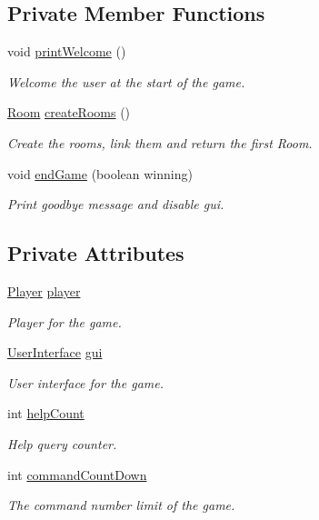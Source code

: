 \subsection*{Private Member Functions}
\begin{DoxyCompactItemize}
\item 
void \hyperlink{classGameEngine_a9a2f3cb921bb19399e357bf14d26425b}{print\-Welcome} ()
\begin{DoxyCompactList}\small\item\em Welcome the user at the start of the game. \end{DoxyCompactList}\item 
\hyperlink{classpkg__world_1_1Room}{Room} \hyperlink{classGameEngine_a9410d92f7d0e6820059b1d07da364b09}{create\-Rooms} ()
\begin{DoxyCompactList}\small\item\em Create the rooms, link them and return the first Room. \end{DoxyCompactList}\item 
void \hyperlink{classGameEngine_a1f5fa36c5dfc36c9a963fe439afc057b}{end\-Game} (boolean winning)
\begin{DoxyCompactList}\small\item\em Print goodbye message and disable gui. \end{DoxyCompactList}\end{DoxyCompactItemize}
\subsection*{Private Attributes}
\begin{DoxyCompactItemize}
\item 
\hyperlink{classpkg__world_1_1Player}{Player} \hyperlink{classGameEngine_a4666c6719428cc43014b30b305eeef5d}{player}
\begin{DoxyCompactList}\small\item\em Player for the game. \end{DoxyCompactList}\item 
\hyperlink{classUserInterface}{User\-Interface} \hyperlink{classGameEngine_a2a7d0bb6183b3f3ef3ee2008926374a0}{gui}
\begin{DoxyCompactList}\small\item\em User interface for the game. \end{DoxyCompactList}\item 
int \hyperlink{classGameEngine_a308a9926d553d53cb4c56c28588f6c62}{help\-Count}
\begin{DoxyCompactList}\small\item\em Help query counter. \end{DoxyCompactList}\item 
int \hyperlink{classGameEngine_ad4ff8d760eced9c7b76cdeb0dc989975}{command\-Count\-Down}
\begin{DoxyCompactList}\small\item\em The command number limit of the game. \end{DoxyCompactList}\end{DoxyCompactItemize}


